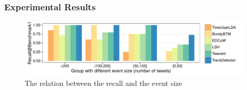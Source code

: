 \documentclass{beamer}
\begin{document}
\begin{frame}
\frametitle{Experimental Results}	
\begin{figure}[h]
	\setlength{\abovecaptionskip}{0.cm}
	\setlength{\belowcaptionskip}{0.cm}
        \centering
        \includegraphics[width=1.0\columnwidth]{../img/barchartOnBenchmark1.pdf}
        \caption{The relation between the recall and the event size}
        \label{fig:Benchmark1}
\end{figure}
\end{frame}
\end{document}
